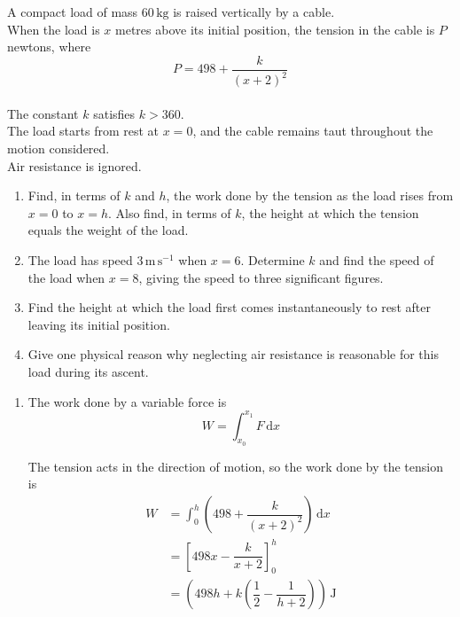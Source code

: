 \documentclass[leqno]{article}
\begin{document}
\begin{enumerate}[
  label=\textbf{\arabic*.},
  leftmargin=*,
  topsep=0pt,
  partopsep=0pt,
  parsep=0pt
]
A compact load of mass $60\,\mathrm{kg}$ is raised vertically by a cable. \\
When the load is $x$ metres above its initial position, the tension in the cable is $P$ newtons, where
\[
P=498+\frac{k}{(x+2)^2}
\] \\
The constant $k$ satisfies $k>360$. \\
The load starts from rest at $x=0$, and the cable remains taut throughout the motion considered. \\
Air resistance is ignored. \\
\begin{enumerate}[label=\textbf{(\alph*)}]
\item Find, in terms of $k$ and $h$, the work done by the tension as the load rises from $x=0$ to $x=h$. Also find, in terms of $k$, the height at which the tension equals the weight of the load.  \\
\item The load has speed $3\,\mathrm{m\,s^{-1}}$ when $x=6$. Determine $k$ and find the speed of the load when $x=8$, giving the speed to three significant figures.  \\
\item Find the height at which the load first comes instantaneously to rest after leaving its initial position.  \\
\item Give one physical reason why neglecting air resistance is reasonable for this load during its ascent.  \\
\end{enumerate}

\vspace*{10pt}

\begin{djsSolution}
\begin{enumerate}[label=\textbf{(\alph*)}, start=1]
\item The work done by a variable force is
\[
W=\int_{x_0}^{x_1}F\,\mathrm{d}x
\]

The tension acts in the direction of motion, so the work done by the tension is
\begin{align*}
W&=\int_0^h\left(498+\dfrac{k}{(x+2)^2}\right)\,\mathrm{d}x\\
&=\left[498x-\dfrac{k}{x+2}\right]_0^h\\
&=\left(498h+k\left(\dfrac12-\dfrac{1}{h+2}\right)\right)\,\mathrm{J}
\end{align*}


\end{enumerate}
\end{djsSolution}
\end{enumerate}
\end{document}
